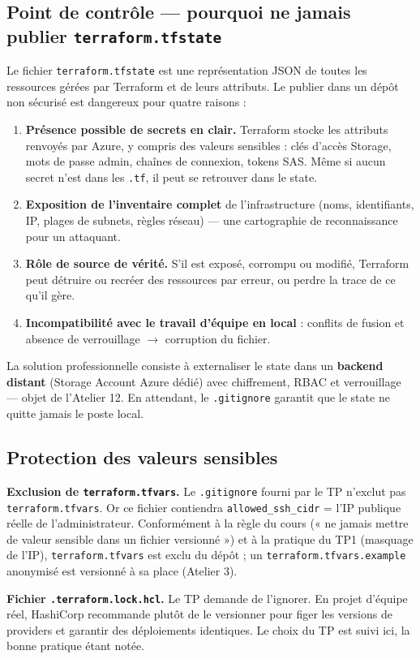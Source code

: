 \documentclass[11pt,a4paper]{article}
\newcommand{\arr}{\ensuremath{\rightarrow}}
\newcommand{\code}[1]{\texttt{#1}}
\begin{document}
\subsection{Point de contrôle — pourquoi ne jamais publier \code{terraform.tfstate}}
Le fichier \code{terraform.tfstate} est une représentation JSON de toutes les ressources gérées par Terraform
et de leurs attributs. Le publier dans un dépôt non sécurisé est dangereux pour quatre raisons :
\begin{enumerate}
  \item \textbf{Présence possible de secrets en clair.} Terraform stocke les attributs renvoyés par Azure, y compris des valeurs sensibles : clés d'accès Storage, mots de passe admin, chaînes de connexion, tokens SAS. Même si aucun secret n'est dans les \code{.tf}, il peut se retrouver dans le state.
  \item \textbf{Exposition de l'inventaire complet} de l'infrastructure (noms, identifiants, IP, plages de subnets, règles réseau) — une cartographie de reconnaissance pour un attaquant.
  \item \textbf{Rôle de source de vérité.} S'il est exposé, corrompu ou modifié, Terraform peut détruire ou recréer des ressources par erreur, ou perdre la trace de ce qu'il gère.
  \item \textbf{Incompatibilité avec le travail d'équipe en local} : conflits de fusion et absence de verrouillage \arr{} corruption du fichier.
\end{enumerate}
La solution professionnelle consiste à externaliser le state dans un \textbf{backend distant} (Storage
Account Azure dédié) avec chiffrement, RBAC et verrouillage — objet de l'Atelier 12. En attendant, le
\code{.gitignore} garantit que le state ne quitte jamais le poste local.

\subsection{Protection des valeurs sensibles}
\textbf{Exclusion de \code{terraform.tfvars}.} Le \code{.gitignore} fourni par le TP n'exclut pas
\code{terraform.tfvars}. Or ce fichier contiendra \code{allowed\_ssh\_cidr} = l'IP publique réelle de
l'administrateur. Conformément à la règle du cours (« ne jamais mettre de valeur sensible dans un fichier
versionné ») et à la pratique du TP1 (masquage de l'IP), \code{terraform.tfvars} est exclu du dépôt ; un
\code{terraform.tfvars.example} anonymisé est versionné à sa place (Atelier 3).

\textbf{Fichier \code{.terraform.lock.hcl}.} Le TP demande de l'ignorer. En projet d'équipe réel, HashiCorp
recommande plutôt de le versionner pour figer les versions de providers et garantir des déploiements
identiques. Le choix du TP est suivi ici, la bonne pratique étant notée.
\end{document}
